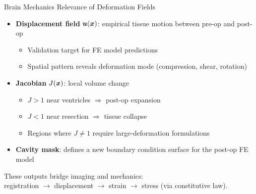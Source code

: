 \begin{frame}{Brain Mechanics Relevance of Deformation Fields}

  \begin{itemize}
    \item \textbf{Displacement field} $\bm{u}(\bm{x})$: empirical tissue
      motion between pre-op and post-op
      \begin{itemize}
        \item Validation target for FE model predictions
        \item Spatial pattern reveals deformation mode
          (compression, shear, rotation)
      \end{itemize}
    \item \textbf{Jacobian} $J(\bm{x})$: local volume change
      \begin{itemize}
        \item $J > 1$ near ventricles $\Rightarrow$ post-op expansion
        \item $J < 1$ near resection $\Rightarrow$ tissue collapse
        \item Regions where $J \neq 1$ require large-deformation
          formulations
      \end{itemize}
    \item \textbf{Cavity mask}: defines a new boundary condition surface
      for the post-op FE model
  \end{itemize}

  \bigskip

  \alert{These outputs bridge imaging and mechanics:}\\
  registration $\to$ displacement $\to$ strain $\to$ stress
  (via constitutive law).

\end{frame}
